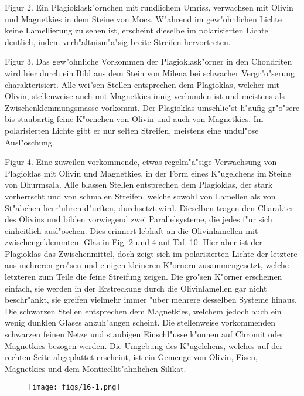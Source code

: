 \documentclass[a4paper, 11pt, oneside, polutonikogreek, german]{article}
\begin{document}
Figur 2. Ein Plagioklask"ornchen mit rundlichem Umriss, verwachsen mit Olivin und Magnetkies in dem Steine von Mocs. W"ahrend im gew"ohnlichen Lichte keine Lamellierung zu sehen ist, erscheint dieselbe im polarisierten Lichte deutlich, indem verh"altnism"a"sig breite Streifen hervortreten.

Figur 3. Das gew"ohnliche Vorkommen der Plagioklask"orner in den Chondriten wird hier durch ein Bild aus dem Stein von Milena bei schwacher Vergr"o"serung charakterisiert. Alle wei"sen Stellen entsprechen dem Plagioklas, welcher mit Olivin, stellenweise auch mit Magnetkies innig verbunden ist und meistens als Zwischenklemmungsmasse vorkommt. Der Plagioklas umschlie"st h"aufig gr"o"sere bis staubartig feine K"ornchen von Olivin und auch von Magnetkies. Im polarisierten Lichte gibt er nur selten Streifen, meistens eine undul"ose Ausl"oschung.

Figur 4. Eine zuweilen vorkommende, etwas regelm"a"sige Verwachsung von Plagioklas mit Olivin und Magnetkies, in der Form eines K"ugelchens im Steine von Dhurmsala. Alle blassen Stellen entsprechen dem Plagioklas, der stark vorherrscht und von schmalen Streifen, welche sowohl von Lamellen als von St"abchen herr"uhren d"urften, durchsetzt wird. Dieselben tragen den Charakter des Olivins und bilden vorwiegend zwei Parallelsysteme, die jedes f"ur sich einheitlich ausl"oschen. Dies erinnert lebhaft an die Olivinlamellen mit zwischengeklemmtem Glas in Fig. 2 und 4 auf Taf. 10. Hier aber ist der Plagioklas das Zwischenmittel, doch zeigt sich im polarisierten Lichte der letztere aus mehreren gro"sen und einigen kleineren K"ornern zusammengesetzt, welche letzteren zum Teile die feine Streifung zeigen. Die gro"sen K"orner erscheinen einfach, sie werden in der Erstreckung durch die Olivinlamellen gar nicht beschr"ankt, sie greifen vielmehr immer "uber mehrere desselben Systeme hinaus. Die schwarzen Stellen entsprechen dem Magnetkies, welchem jedoch auch ein wenig dunklen Glases anzuh"angen scheint. Die stellenweise vorkommenden schwarzen feinen Netze und staubigen Einschl"usse k"onnen auf Chromit oder Magnetkies bezogen werden. Die Umgebung des K"ugelchens, welches auf der rechten Seite abgeplattet erscheint, ist ein Gemenge von Olivin, Eisen, Magnetkies und dem Monticellit"ahnlichen Silikat.
\clearpage

\vspace*{\fill}
\begin{figure}[H]
\centering
\texttt{[image: figs/16-1.png]}
\caption{}
\end{figure}
\vspace*{\fill}
\clearpage
\end{document}
